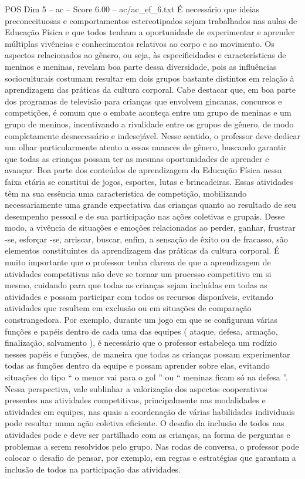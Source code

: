 \begin{textsample}{POS Dim 5 – ac – Score 6.00 – ac/ac\_ef\_6.txt}
É necessário que ideias preconceituosas e comportamentos estereotipados sejam trabalhados nas aulas de Educação Física e que todos tenham a oportunidade de experimentar e aprender múltiplas vivências e conhecimentos relativos ao corpo e ao movimento.
Os aspectos relacionados ao gênero, ou seja, às especificidades e características de meninos e meninas, revelam boa parte dessa diversidade, pois as influências socioculturais costumam resultar em dois grupos bastante distintos em relação à aprendizagem das práticas da cultura corporal.
Cabe destacar que, em boa parte dos programas de televisão para crianças que envolvem gincanas, concursos e competições, é comum que o embate aconteça entre um grupo de meninas e um grupo de meninos, incentivando a rivalidade entre os grupos de gênero, de modo completamente desnecessário e indesejável.
Nesse sentido, o professor deve dedicar um olhar particularmente atento a essas nuances de gênero, buscando garantir que todas as crianças possam ter as mesmas oportunidades de aprender e avançar.
Boa parte dos conteúdos de aprendizagem da Educação Física nessa faixa etária se constitui de jogos, esportes, lutas e brincadeiras.
Essas atividades têm na sua essência uma característica de competição, mobilizando necessariamente uma grande expectativa das crianças quanto ao resultado de seu desempenho pessoal e de sua participação nas ações coletivas e grupais.
Desse modo, a vivência de situações e emoções relacionadas ao perder, ganhar, frustrar -se, esforçar -se, arriscar, buscar, enfim, a sensação de êxito ou de fracasso, são elementos constituintes da aprendizagem das práticas da cultura corporal.
É muito importante que o professor tenha clareza de que a aprendizagem de atividades competitivas não deve se tornar um processo competitivo em si mesmo, cuidando para que todas as crianças sejam incluídas em todas as atividades e possam participar com todos os recursos disponíveis, evitando atividades que resultem em exclusão ou em situações de comparação constrangedora.
Por exemplo, durante um jogo em que se configuram várias funções e papéis dentro de cada uma das equipes ( ataque, defesa, armação, finalização, salvamento ), é necessário que o professor estabeleça um rodízio nesses papéis e funções, de maneira que todas as crianças possam experimentar todas as funções dentro da equipe e possam aprender sobre elas, evitando situações do tipo “ o menor vai para o gol ” ou “ meninas ficam só na defesa ”.
Nessa perspectiva, vale sublinhar a valorização dos aspectos cooperativos presentes nas atividades competitivas, principalmente nas modalidades e atividades em equipes, nas quais a coordenação de várias habilidades individuais pode resultar numa ação coletiva eficiente.
O desafio da inclusão de todos nas atividades pode e deve ser partilhado com as crianças, na forma de perguntas e problemas a serem resolvidos pelo grupo.
Nas rodas de conversa, o professor pode colocar o desafio de pensar, por exemplo, em regras e estratégias que garantam a inclusão de todos na participação das atividades.

\end{textsample}
